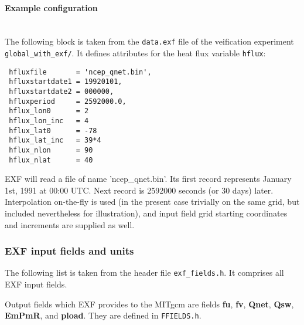 \paragraph{Example configuration} ~ \\
%
The following block is taken from the \texttt{data.exf} file
of the veification experiment \texttt{global\_with\_exf/}.
It defines attributes for the heat flux variable \texttt{hflux}:

\begin{verbatim}
 hfluxfile       = 'ncep_qnet.bin',
 hfluxstartdate1 = 19920101,
 hfluxstartdate2 = 000000,
 hfluxperiod     = 2592000.0,
 hflux_lon0      = 2
 hflux_lon_inc   = 4
 hflux_lat0      = -78
 hflux_lat_inc   = 39*4
 hflux_nlon      = 90
 hflux_nlat      = 40
\end{verbatim}

EXF will read a file of name 'ncep\_qnet.bin'.
Its first record represents January 1st, 1991 at 00:00 UTC.
Next record is 2592000 seconds (or 30 days) later.
Interpolation on-the-fly is used (in the present case trivially
on the same grid, but included nevertheless for illustration), 
and input field grid starting coordinates and increments are 
supplied as well.


\subsubsection{EXF input fields and units
\label{sec:pkg:exf:fields_units}}

The following list is taken from the header file \texttt{exf\_fields.h}.
It comprises all EXF input fields.

Output fields which EXF provides to the MITgcm are fields
\textbf{fu}, \textbf{fv}, \textbf{Qnet}, \textbf{Qsw}, \textbf{EmPmR},
and \textbf{pload}. They are defined in \texttt{FFIELDS.h}.

